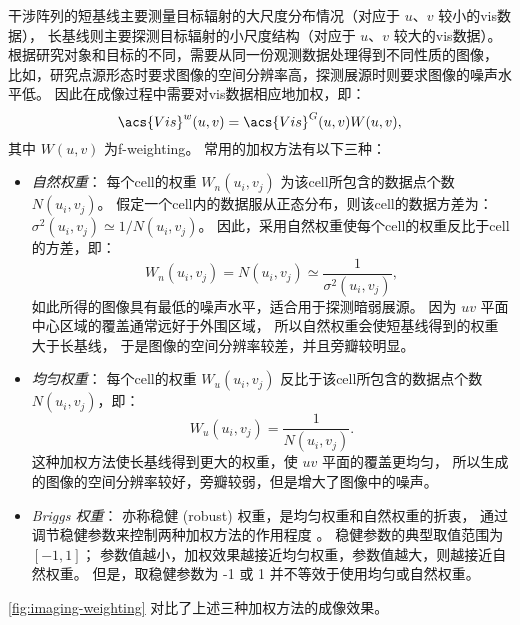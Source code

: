 干涉阵列的短基线主要测量目标辐射的大尺度分布情况（对应于 $u$、$v$ 较小的\ac{vis}数据），
长基线则主要探测目标辐射的小尺度结构（对应于 $u$、$v$ 较大的\ac{vis}数据）。
根据研究对象和目标的不同，需要从同一份观测数据处理得到不同性质的图像，
比如，研究点源形态时要求图像的空间分辨率高，探测展源时则要求图像的噪声水平低。
因此在成像过程中需要对\ac{vis}数据相应地加权，即：
\begin{equation}
  \acs{Vis}^{w}(u,v) = \acs{Vis}^{G}(u,v) W(u,v) ,
\end{equation}
其中 $W(u,v)$ 为\ac{f-weighting}。
常用的加权方法有以下三种：
\begin{itemize}
  \item \emph{自然权重}：
    每个\ac{cell}的权重 $W_n(u_i, v_j)$ 为该\ac{cell}所包含的数据点个数
    $N(u_i, v_j)$。
    假定一个\ac{cell}内的数据服从正态分布，则该\ac{cell}的数据方差为：
    $\sigma^2(u_i, v_j) \simeq 1/N(u_i, v_j)$。
    因此，采用自然权重使每个\ac{cell}的权重反比于\ac{cell}的方差，即：
    \begin{equation}
      W_n(u_i, v_j) = N(u_i, v_j) \simeq \frac{1}{\sigma^2(u_i, v_j)} ,
    \end{equation}
    如此所得的图像具有最低的噪声水平，适合用于探测暗弱展源。
    因为 $uv$ 平面中心区域的覆盖通常远好于外围区域，
    所以自然权重会使短基线得到的权重大于长基线，
    于是图像的空间分辨率较差，并且旁瓣较明显。
  
  \item \emph{均匀权重}：
    每个\ac{cell}的权重 $W_u(u_i, v_j)$ 反比于该\ac{cell}所包含的数据点个数
    $N(u_i, v_j)$，即：
    \begin{equation}
      W_u(u_i, v_j) = \frac{1}{N(u_i, v_j)} .
    \end{equation}
    这种加权方法使长基线得到更大的权重，使 $uv$ 平面的覆盖更均匀，
    所以生成的图像的空间分辨率较好，旁瓣较弱，但是增大了图像中的噪声。
  
  \item \emph{Briggs 权重}：
    亦称稳健 (robust) 权重，是均匀权重和自然权重的折衷，
    通过调节稳健参数来控制两种加权方法的作用程度 \cite{briggs1995}。
    稳健参数的典型取值范围为 $[-1, 1]$；
    参数值越小，加权效果越接近均匀权重，参数值越大，则越接近自然权重。
    但是，取稳健参数为 -1 或 1 并不等效于使用均匀或自然权重。
\end{itemize}
\autoref{fig:imaging-weighting} 对比了上述三种加权方法的成像效果。

